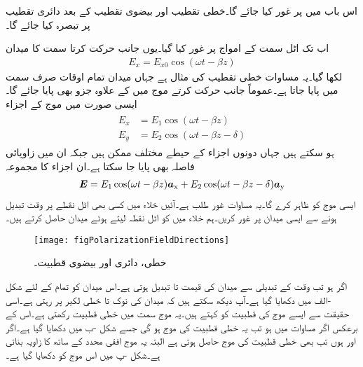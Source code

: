 اس باب میں   پر غور کیا جائے گا۔خطی تقطیب اور بیضوی تقطیب کے بعد دائری تقطیب پر تبصرہ کیا جائے گا۔

اب تک اٹل سمت کے امواج پر غور کیا گیا۔یوں  جانب حرکت کرتا  سمت کا میدان
\begin{align}
E_x = E_{x0} \cos (\omega t -\beta z)
\end{align}
لکھا گیا۔یہ مساوات خطی تقطیب کی مثال ہے جہاں میدان تمام اوقات صرف  سمت میں پایا جاتا ہے۔عموماً  جانب حرکت کرتے موج میں  کے علاوہ  جزو بھی پایا جائے گا۔ایسی صورت میں موج کے اجزاء
\begin{gather}
\begin{aligned}\label{مساوات_قطبیت_عمومی_اجزاء}
E_x&=E_1 \cos (\omega t -\beta z)\\
E_y&=E_2 \cos (\omega t -\beta z -\delta)
\end{aligned}
\end{gather}
ہو سکتے ہیں جہاں دونوں اجزاء کے حیطے مختلف ممکن ہیں جبکہ ان میں زاویائی فاصلہ  بھی پایا جا سکتا ہے۔ان اجزاء کا مجموعہ
\begin{align}\label{مساوات_قطبیت_عمومی_مساوات}
{\ensuremath{{\boldsymbol{E}}}}=E_1 \cos (\omega t -\beta z) {\boldsymbol{a}}_{\textup{x}}+E_2 \cos (\omega t -\beta z -\delta) {\boldsymbol{a}}_{\textup{y}}
\end{align}
ایسی موج کو ظاہر کرے گا۔یہ مساوات غور طلب ہے۔آئیں خلاء میں کسی بھی اٹل نقطے پر وقت تبدیل ہونے سے  ایسی میدان پر غور کریں۔ہم خلاء میں   کو اٹل نقطہ لیتے ہوئے  میدان حاصل کرتے ہیں۔

\begin{figure}
\centering
\texttt{[image: figPolarizationFieldDirections]}
\caption{خطی، دائری اور بیضوی قطبیت۔}
\label{شکل_قطبیت_خطی_قطبیت}
\end{figure}
اگر  ہو تب وقت  کے تبدیلی سے میدان کی قیمت  تا  تبدیل ہوتی ہے۔اس میدان کو تمام  کے لئے شکل -الف میں دکھایا گیا ہے۔آپ دیکھ سکتے ہیں کہ میدان کی نوک  تا  خطی لکیر پر رہتی ہے۔اسی حقیقت سے ایسے موج کی قطبیت کو   کہتے ہیں۔یہ موج  سمت میں خطی قطبیت رکھتی ہے۔اس کے برعکس اگر مساوات  میں  ہو تب یہ  خطی قطبیت کی موج ہو گی جسے شکل -ب میں دکھایا گیا ہے۔اگر  اور  ہوں تب بھی خطی قطبیت کی موج حاصل ہوتی ہے البتہ یہ موج افقی محدد کے ساتھ  کا زاویہ بناتی ہے۔شکل -پ میں اس موج کو دکھایا گیا ہے۔

